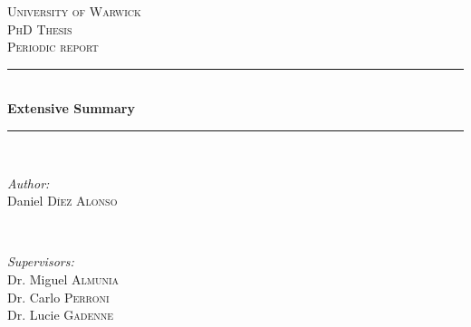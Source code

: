 \documentclass[12pt]{article}%
\begin{document}
\begin{titlepage}

\newcommand{\HRule}{\rule{\linewidth}{0.5mm}} %

\center %
 

\textsc{\LARGE University of Warwick}\\[1.5cm] %
\textsc{\Large PhD Thesis}\\[0.5cm] %
\textsc{\large Periodic report}\\[0.5cm] %


\HRule \\[0.4cm]
{ \huge \bfseries Extensive Summary}\\[0.4cm] %
\HRule \\[1.5cm]
 

\begin{minipage}{0.4\textwidth}
\begin{flushleft} \large
\emph{Author:}\\
Daniel \textsc{D\'iez Alonso} %
\end{flushleft}
\end{minipage}
~
\begin{minipage}{0.4\textwidth}
\begin{flushright} \large
\emph{Supervisors:} \\
Dr. Miguel \textsc{Almunia} \\ %
Dr. Carlo \textsc{Perroni} \\
Dr. Lucie \textsc{Gadenne}
\end{flushright}
\end{minipage}\\[2cm]


\end{titlepage}
\end{document}
